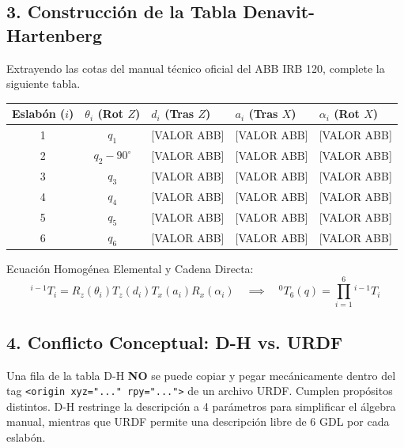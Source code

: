 \documentclass[11pt, a4paper]{article}
\begin{document}
\subsection*{3. Construcción de la Tabla Denavit-Hartenberg}
Extrayendo las cotas del manual técnico oficial del ABB IRB 120, complete la siguiente tabla.
\begin{center}
    \renewcommand{\arraystretch}{1.5}
    \begin{tabularx}{\textwidth}{@{} c c X X X @{}}
    \toprule
    \textbf{Eslabón ($i$)} & \textbf{$\theta_i$ (Rot $Z$)} & \textbf{$d_i$ (Tras $Z$)} & \textbf{$a_i$ (Tras $X$)} & \textbf{$\alpha_i$ (Rot $X$)} \\ \midrule
    1 & $q_1$ & [VALOR ABB] & [VALOR ABB] & [VALOR ABB] \\
    2 & $q_2 - 90^\circ$ & [VALOR ABB] & [VALOR ABB] & [VALOR ABB] \\
    3 & $q_3$ & [VALOR ABB] & [VALOR ABB] & [VALOR ABB] \\
    4 & $q_4$ & [VALOR ABB] & [VALOR ABB] & [VALOR ABB] \\
    5 & $q_5$ & [VALOR ABB] & [VALOR ABB] & [VALOR ABB] \\
    6 & $q_6$ & [VALOR ABB] & [VALOR ABB] & [VALOR ABB] \\ \bottomrule
    \end{tabularx}
\end{center}

\noindent Ecuación Homogénea Elemental y Cadena Directa:
\begin{equation}
    ^{i-1}T_i = R_z(\theta_i) T_z(d_i) T_x(a_i) R_x(\alpha_i) \quad \implies \quad ^0T_6(q) = \prod_{i=1}^{6} {}^{i-1}T_i
\end{equation}

\newpage
\subsection*{4. Conflicto Conceptual: D-H vs. URDF}
\begin{tcolorbox}[colback=red!5!white, colframe=red!75!black, title=\textbf{¡Precaución Arquitectónica!}]
Una fila de la tabla D-H \textbf{NO} se puede copiar y pegar mecánicamente dentro del tag \texttt{<origin xyz="..." rpy="...">} de un archivo URDF. Cumplen propósitos distintos. D-H restringe la descripción a 4 parámetros para simplificar el álgebra manual, mientras que URDF permite una descripción libre de 6 GDL por cada eslabón.
\end{tcolorbox}
\end{document}
